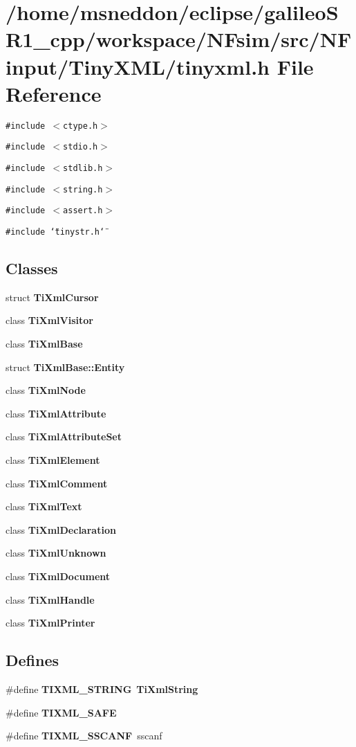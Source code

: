 \section{/home/msneddon/eclipse/galileoSR1\_\-cpp/workspace/NFsim/src/NFinput/TinyXML/tinyxml.h File Reference}
\label{tinyxml_8h}


{\tt \#include $<$ctype.h$>$}\par
{\tt \#include $<$stdio.h$>$}\par
{\tt \#include $<$stdlib.h$>$}\par
{\tt \#include $<$string.h$>$}\par
{\tt \#include $<$assert.h$>$}\par
{\tt \#include \char`\"{}tinystr.h\char`\"{}}\par
\subsection*{Classes}
\begin{CompactItemize}
\item 
struct {\bf TiXmlCursor}
\item 
class {\bf TiXmlVisitor}
\item 
class {\bf TiXmlBase}
\item 
struct \textbf{TiXmlBase::Entity}
\item 
class {\bf TiXmlNode}
\item 
class {\bf TiXmlAttribute}
\item 
class {\bf TiXmlAttributeSet}
\item 
class {\bf TiXmlElement}
\item 
class {\bf TiXmlComment}
\item 
class {\bf TiXmlText}
\item 
class {\bf TiXmlDeclaration}
\item 
class {\bf TiXmlUnknown}
\item 
class {\bf TiXmlDocument}
\item 
class {\bf TiXmlHandle}
\item 
class {\bf TiXmlPrinter}
\end{CompactItemize}
\subsection*{Defines}
\begin{CompactItemize}
\item 
\#define {\bf TIXML\_\-STRING}~{\bf TiXmlString}
\item 
\#define {\bf TIXML\_\-SAFE}
\item 
\#define {\bf TIXML\_\-SSCANF}~sscanf
\end{CompactItemize}
